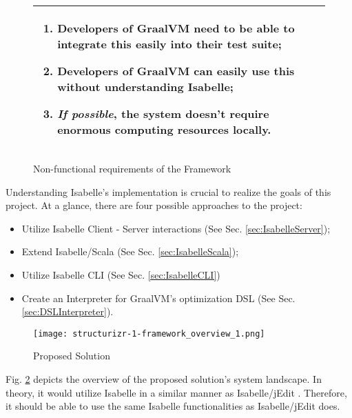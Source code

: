 \begin{figure}[!htb]
      \begin{tabular}{|L{0.95\textwidth}|}
            \hline
            \begin{enumerate}
                  \item Developers of GraalVM need to be able to integrate this easily into their test suite;
                  \item Developers of GraalVM can easily use this without understanding Isabelle;
                  \item \emph{If possible}, the system doesn't require enormous computing resources locally.
            \end{enumerate} \\
            \hline
      \end{tabular}
      \caption{Non-functional requirements of the Framework}
      \label{fig:requirements}
\end{figure}

Understanding Isabelle's implementation is crucial to realize the goals of this project. At a glance, there are four possible approaches 
to the project:

\begin{itemize}
    \item Utilize Isabelle Client - Server interactions (See Sec. \ref{sec:IsabelleServer});
    \item Extend Isabelle/Scala (See Sec. \ref{sec:IsabelleScala});
    \item Utilize Isabelle CLI (See Sec. \ref{sec:IsabelleCLI})
    \item Create an Interpreter for GraalVM's optimization DSL (See Sec. \ref{sec:DSLInterpreter}).
\end{itemize}

\begin{figure}[!htb]
      \centering
      \texttt{[image: structurizr-1-framework\_overview\_1.png]}
      \caption{Proposed Solution}
      \label{fig:SystemLandscape}
\end{figure}


Fig. \ref{fig:SystemLandscape} depicts the overview of the proposed solution's system landscape. In theory, it would utilize Isabelle in a similar 
manner as Isabelle/jEdit \cite{isabelleSystem}. Therefore, it should be able to use the same Isabelle functionalities as Isabelle/jEdit does.

